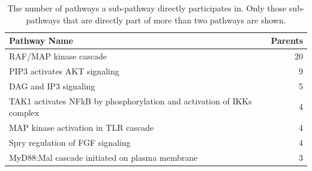 \documentclass[10pt,twoside]{article}
\begin{document}
\begin{table}[H]
  \centering
  \caption[The number of pathways a sub-pathway directly participates in]{The number of pathways a sub-pathway directly participates in. Only those sub-pathways that are directly part of more than two pathways are shown.}
  \begin{tabular}{lr}
    \toprule
    Pathway Name&	Parents\\\midrule
    RAF/MAP kinase cascade&	20\\
    PIP3 activates AKT signaling&	9\\
    DAG and IP3 signaling&	5\\
    TAK1 activates NFkB by phosphorylation and activation of IKKs complex&	4\\
    MAP kinase activation in TLR cascade&	4\\
    Spry regulation of FGF signaling&	4\\
    MyD88:Mal cascade initiated on plasma membrane&	3\\
\bottomrule
  \end{tabular}
  \label{tab:st1}
\end{table}

\clearpage
\end{document}
